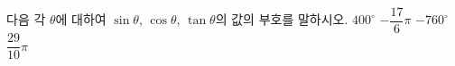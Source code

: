 다음 각 $\theta$에 대하여 $\sin\theta$, $\cos\theta$, $\tan\theta$의 값의 부호를 말하시오.
 $400^\circ$
 $-\dfrac{17}{6}\pi$
 $-760^\circ$
 $\dfrac{29}{10}\pi$
